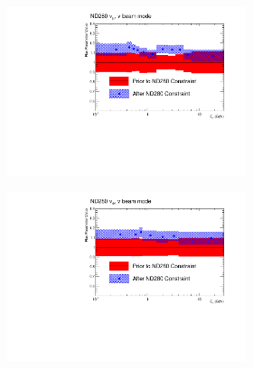 \begin{figure}[h]
\begin{subfigure}[t]{\textwidth}
\begin{subfigure}[t]{0.24\textwidth}
	\includegraphics[width=\textwidth, trim={0mm 0mm 20mm 0mm}, clip]{figures/official/nd_pf_numu_flux_parms_bias_01}
\end{subfigure}
\begin{subfigure}[t]{0.24\textwidth}
	\includegraphics[width=\textwidth, trim={0mm 0mm 20mm 0mm}, clip]{figures/official/nd_pf_nue_flux_parms_bias_01}
\end{subfigure}
\begin{subfigure}[t]{0.24\textwidth}

\end{subfigure}
\end{subfigure}
\end{figure}
